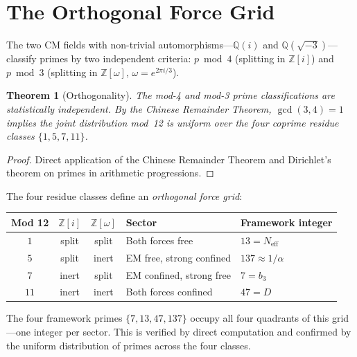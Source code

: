 \documentclass[12pt]{article}
\newtheorem{theorem}{Theorem}[section]
\theoremstyle{definition}
\theoremstyle{remark}
\begin{document}
\section{The Orthogonal Force Grid}
\label{sec:orthogonal}

The two CM fields with non-trivial automorphisms---$\mathbb{Q}(i)$ and $\mathbb{Q}(\sqrt{-3})$---classify primes by two independent criteria: $p \bmod 4$ (splitting in $\mathbb{Z}[i]$) and $p \bmod 3$ (splitting in $\mathbb{Z}[\omega]$, $\omega = e^{2\pi i/3}$).

\begin{theorem}[Orthogonality]
\label{thm:orthogonal}
The mod-4 and mod-3 prime classifications are statistically independent. By the Chinese Remainder Theorem, $\gcd(3,4) = 1$ implies the joint distribution mod~12 is uniform over the four coprime residue classes $\{1, 5, 7, 11\}$.
\end{theorem}

\begin{proof}
Direct application of the Chinese Remainder Theorem and Dirichlet's theorem on primes in arithmetic progressions. \qedhere
\end{proof}

The four residue classes define an \emph{orthogonal force grid}:

\begin{center}
\renewcommand{\arraystretch}{1.2}
\begin{tabular}{@{}cccll@{}}
\toprule
Mod 12 & $\mathbb{Z}[i]$ & $\mathbb{Z}[\omega]$ & Sector & Framework integer \\
\midrule
$1$ & split & split & Both forces free & $13 = N_\mathrm{eff}$ \\
$5$ & split & inert & EM free, strong confined & $137 \approx 1/\alpha$ \\
$7$ & inert & split & EM confined, strong free & $7 = b_3$ \\
$11$ & inert & inert & Both forces confined & $47 = D$ \\
\bottomrule
\end{tabular}
\end{center}

The four framework primes $\{7, 13, 47, 137\}$ occupy all four quadrants of this grid---one integer per sector. This is verified by direct computation and confirmed by the uniform distribution of primes across the four classes.
\end{document}

